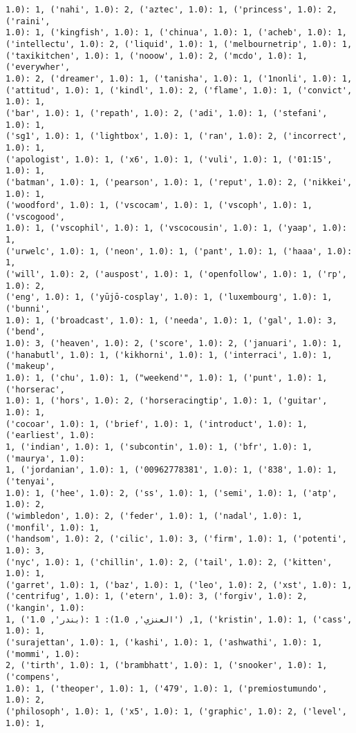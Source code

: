 \documentclass[11pt]{article}
\begin{document}
\begin{Verbatim}[commandchars=\\\{\}]
1.0): 1, ('nahi', 1.0): 2, ('aztec', 1.0): 1, ('princess', 1.0): 2, ('raini',
1.0): 1, ('kingfish', 1.0): 1, ('chinua', 1.0): 1, ('acheb', 1.0): 1,
('intellectu', 1.0): 2, ('liquid', 1.0): 1, ('melbournetrip', 1.0): 1,
('taxikitchen', 1.0): 1, ('nooow', 1.0): 2, ('mcdo', 1.0): 1, ('everywher',
1.0): 2, ('dreamer', 1.0): 1, ('tanisha', 1.0): 1, ('1nonli', 1.0): 1,
('attitud', 1.0): 1, ('kindl', 1.0): 2, ('flame', 1.0): 1, ('convict', 1.0): 1,
('bar', 1.0): 1, ('repath', 1.0): 2, ('adi', 1.0): 1, ('stefani', 1.0): 1,
('sg1', 1.0): 1, ('lightbox', 1.0): 1, ('ran', 1.0): 2, ('incorrect', 1.0): 1,
('apologist', 1.0): 1, ('x6', 1.0): 1, ('vuli', 1.0): 1, ('01:15', 1.0): 1,
('batman', 1.0): 1, ('pearson', 1.0): 1, ('reput', 1.0): 2, ('nikkei', 1.0): 1,
('woodford', 1.0): 1, ('vscocam', 1.0): 1, ('vscoph', 1.0): 1, ('vscogood',
1.0): 1, ('vscophil', 1.0): 1, ('vscocousin', 1.0): 1, ('yaap', 1.0): 1,
('urwelc', 1.0): 1, ('neon', 1.0): 1, ('pant', 1.0): 1, ('haaa', 1.0): 1,
('will', 1.0): 2, ('auspost', 1.0): 1, ('openfollow', 1.0): 1, ('rp', 1.0): 2,
('eng', 1.0): 1, ('yūjō-cosplay', 1.0): 1, ('luxembourg', 1.0): 1, ('bunni',
1.0): 1, ('broadcast', 1.0): 1, ('needa', 1.0): 1, ('gal', 1.0): 3, ('bend',
1.0): 3, ('heaven', 1.0): 2, ('score', 1.0): 2, ('januari', 1.0): 1,
('hanabutl', 1.0): 1, ('kikhorni', 1.0): 1, ('interraci', 1.0): 1, ('makeup',
1.0): 1, ('chu', 1.0): 1, ("weekend'", 1.0): 1, ('punt', 1.0): 1, ('horserac',
1.0): 1, ('hors', 1.0): 2, ('horseracingtip', 1.0): 1, ('guitar', 1.0): 1,
('cocoar', 1.0): 1, ('brief', 1.0): 1, ('introduct', 1.0): 1, ('earliest', 1.0):
1, ('indian', 1.0): 1, ('subcontin', 1.0): 1, ('bfr', 1.0): 1, ('maurya', 1.0):
1, ('jordanian', 1.0): 1, ('00962778381', 1.0): 1, ('838', 1.0): 1, ('tenyai',
1.0): 1, ('hee', 1.0): 2, ('ss', 1.0): 1, ('semi', 1.0): 1, ('atp', 1.0): 2,
('wimbledon', 1.0): 2, ('feder', 1.0): 1, ('nadal', 1.0): 1, ('monfil', 1.0): 1,
('handsom', 1.0): 2, ('cilic', 1.0): 3, ('firm', 1.0): 1, ('potenti', 1.0): 3,
('nyc', 1.0): 1, ('chillin', 1.0): 2, ('tail', 1.0): 2, ('kitten', 1.0): 1,
('garret', 1.0): 1, ('baz', 1.0): 1, ('leo', 1.0): 2, ('xst', 1.0): 1,
('centrifug', 1.0): 1, ('etern', 1.0): 3, ('forgiv', 1.0): 2, ('kangin', 1.0):
1, ('بندر', 1.0): 1, ('العنزي', 1.0): 1, ('kristin', 1.0): 1, ('cass', 1.0): 1,
('surajettan', 1.0): 1, ('kashi', 1.0): 1, ('ashwathi', 1.0): 1, ('mommi', 1.0):
2, ('tirth', 1.0): 1, ('brambhatt', 1.0): 1, ('snooker', 1.0): 1, ('compens',
1.0): 1, ('theoper', 1.0): 1, ('479', 1.0): 1, ('premiostumundo', 1.0): 2,
('philosoph', 1.0): 1, ('x5', 1.0): 1, ('graphic', 1.0): 2, ('level', 1.0): 1,

\end{Verbatim}
\end{document}
